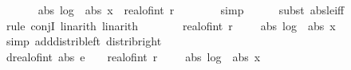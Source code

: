\begin{isabellebody}
\ \isamarkupfalse%
\ {\isachardoublequoteopen}{\isachardot}{\kern0pt}{\isachardot}{\kern0pt}{\isachardot}{\kern0pt}\ {\isasymle}\ {}\ {\isacharplus}{\kern0pt}\ abs\ {\isacharparenleft}{\kern0pt}log\ {}\ {\isacharparenleft}{\kern0pt}abs\ x{\isacharparenright}{\kern0pt}{\isacharparenright}{\kern0pt}\ {\isacharplus}{\kern0pt}\ real{\isacharunderscore}{\kern0pt}of{\isacharunderscore}{\kern0pt}int\ r\ {\isacharplus}{\kern0pt}\ {}{\isachardoublequoteclose}\isanewline
\ \ \ \ \isamarkupfalse%
\ {\isacharparenleft}{\kern0pt}simp{\isacharparenright}{\kern0pt}\isanewline
\ \ \ \ \isamarkupfalse%
\ {\isacharparenleft}{\kern0pt}subst\ abs{\isacharunderscore}{\kern0pt}le{\isacharunderscore}{\kern0pt}iff{\isacharparenright}{\kern0pt}\isanewline
\ \ \ \ \isamarkupfalse%
\ {\isacharparenleft}{\kern0pt}rule\ conjI{\isacharcomma}{\kern0pt}\ linarith{\isacharcomma}{\kern0pt}\ linarith{\isacharparenright}{\kern0pt}\isanewline
\ \ \isamarkupfalse%
\ \isamarkupfalse%
\ {\isachardoublequoteopen}{\isachardot}{\kern0pt}{\isachardot}{\kern0pt}{\isachardot}{\kern0pt}\ {\isasymle}\ {\isacharparenleft}{\kern0pt}real{\isacharunderscore}{\kern0pt}of{\isacharunderscore}{\kern0pt}int\ r{\isacharplus}{\kern0pt}\ {}{\isacharparenright}{\kern0pt}\ {\isacharasterisk}{\kern0pt}\ {\isacharparenleft}{\kern0pt}{}\ {\isacharplus}{\kern0pt}\ abs\ {\isacharparenleft}{\kern0pt}log\ {}\ {\isacharparenleft}{\kern0pt}abs\ x{\isacharparenright}{\kern0pt}{\isacharparenright}{\kern0pt}{\isacharparenright}{\kern0pt}{\isachardoublequoteclose}\isanewline
\ \ \ \ \isamarkupfalse%
\ {\isacharparenleft}{\kern0pt}simp\ add{\isacharcolon}{\kern0pt}distrib{\isacharunderscore}{\kern0pt}left\ distrib{\isacharunderscore}{\kern0pt}right{\isacharparenright}{\kern0pt}\isanewline
\ \ \isamarkupfalse%
\ \isamarkupfalse%
\ d{\isacharcolon}{\kern0pt}{\isachardoublequoteopen}real{\isacharunderscore}{\kern0pt}of{\isacharunderscore}{\kern0pt}int\ {\isacharparenleft}{\kern0pt}abs\ e\ {\isacharplus}{\kern0pt}\ {}{\isacharparenright}{\kern0pt}\ {\isasymle}\ {\isacharparenleft}{\kern0pt}real{\isacharunderscore}{\kern0pt}of{\isacharunderscore}{\kern0pt}int\ r{\isacharplus}{\kern0pt}\ {}{\isacharparenright}{\kern0pt}\ {\isacharasterisk}{\kern0pt}\ {\isacharparenleft}{\kern0pt}{}\ {\isacharplus}{\kern0pt}\ abs\ {\isacharparenleft}{\kern0pt}log\ {}\ {\isacharparenleft}{\kern0pt}abs\ x{\isacharparenright}{\kern0pt}{\isacharparenright}{\kern0pt}{\isacharparenright}{\kern0pt}{\isachardoublequoteclose}\ \isamarkupfalse%

\end{isabellebody}
